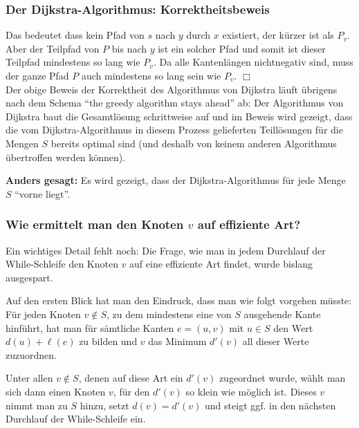 \documentclass[smaller]{beamer}
\begin{document}
\begin{frame}
\frametitle{Der Dijkstra-Algorithmus: Korrektheitsbeweis}
Das bedeutet dass kein Pfad von $s$ nach $y$ durch $x$ existiert, der kürzer ist als $P_v$. Aber der Teilpfad von $P$ bis nach $y$ ist ein solcher Pfad und somit ist dieser Teilpfad mindestens so lang wie $P_v$. Da alle Kantenlängen nichtnegativ sind, muss der ganze Pfad $P$ auch mindestens so lang sein wie $P_v$. \qquad $\Box$ \\ \vspace*{0.2cm}
Der obige Beweis der Korrektheit des Algorithmus von Dijkstra läuft übrigens nach dem Schema \alert{\enquote{the greedy algorithm stays ahead}} ab: Der Algorithmus von Dijkstra baut die Gesamtlösung schrittweise auf und im Beweis wird gezeigt, dass die vom Dijkstra-Algorithmus in diesem Prozess gelieferten Teillösungen für die Mengen $S$ bereits optimal sind (und deshalb von keinem anderen Algorithmus übertroffen werden können). \\ \vspace*{0.2cm}

\textbf{Anders gesagt:} Es wird gezeigt, dass der Dijkstra-Algorithmus für jede Menge $S$ \alert{\enquote{vorne liegt}.}

\end{frame}

\begin{frame}
\frametitle{Wie ermittelt man den Knoten $v$ auf effiziente Art?}
Ein \alert{wichtiges Detail} fehlt noch: \alert{Die Frage, wie man in jedem Durchlauf der While-Schleife den Knoten $v$ auf eine effiziente Art findet, wurde bislang ausgespart.} \\ \vspace*{0.2cm}

Auf den ersten Blick hat man den Eindruck, dass man wie folgt vorgehen müsste: Für jeden Knoten $v \notin S$, zu dem mindestens eine von $S$ ausgehende Kante hinführt, hat man für sämtliche Kanten $e = (u,v)$ mit $u \in S$ den Wert $d(u) + \ell(e)$ zu bilden und $v$ das Minimum $d'(v)$ all dieser Werte zuzuordnen. \\ \vspace*{0.2cm}

Unter allen $v \notin S$, denen auf diese Art ein $d'(v)$ zugeordnet wurde, wählt man sich dann einen Knoten $v$, für den $d'(v)$ so klein wie möglich ist. Dieses $v$ nimmt man zu $S$ hinzu, setzt $d(v) = d'(v)$ und steigt ggf. in den nächsten Durchlauf der While-Schleife ein.
\end{frame}
\end{document}
